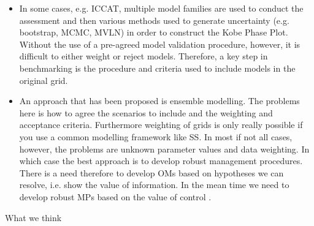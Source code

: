 \begin{itemize}
  \item In some cases, e.g. ICCAT, multiple model families are used to conduct the assessment and then various methods used to generate uncertainty (e.g. bootstrap, MCMC, MVLN) in order to construct the Kobe Phase Plot. Without the use of a pre-agreed model validation procedure, however, it is difficult to either weight or reject models. Therefore, a key step in benchmarking is the procedure and criteria used to include models in the original grid. 

  \item An approach that has been proposed is ensemble modelling. The problems here is how to agree the scenarios to include and the weighting and acceptance criteria. Furthermore weighting of grids is only really possible if you use a common modelling framework like SS. In most if not all cases, however, the problems are unknown parameter values and data weighting. In which case the best approach is to develop robust management procedures. There is a need therefore to develop OMs based on hypotheses we can resolve, i.e. show the value of information. In the mean time we need to develop robust MPs based on the value of control .
\end{itemize}
  
 What we think
 
